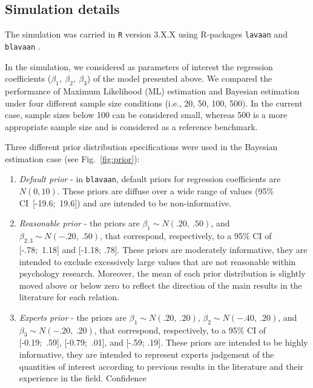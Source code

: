 \documentclass[graybox]{svmult}
\begin{document}
\subsection{Simulation details}

The simulation was carried in \texttt{R} version 3.X.X \cite{rcoreteamLanguageEnvironmentStatistical2018} using R-packages \texttt{lavaan} \cite{rosseelLavaanPackageStructural2012} and \texttt{blavaan} \cite{merkleBlavaanBayesianStructural2018}.

In the simulation, we  considered as parameters of interest the regression coefficients ($\beta_1,\ \beta_2,\ \beta_3$) of the model presented above. We compared the performance of Maximum Likelihood (ML) estimation and Bayesian estimation under four different sample size conditions (i.e., 20, 50, 100, 500). In the current case, sample sizes below 100 can be considered small, whereas 500 is a more appropriate sample size and is considered as a reference benchmark.

Three different prior distribution specifications were used in the Bayesian estimation case (see Fig.~\ref{fig:prior}):

\begin{enumerate}
	\item{\textit{Default prior} -  in \texttt{blavaan}, default priors for regression coefficients are $N(0,10)$}. These priors are diffuse over a wide range of values (95\% CI\ [-19.6;\ 19.6]) and are intended to be non-informative.
	\item{\textit{Reasonable prior} - the priors are $\beta_1\sim N(.20,\ .50)$, and  $\beta_{2;3}\sim N(-.20,\ .50)$, that correspond, respectively, to a 95\% CI of  [-.78;\ 1.18] and  [-1.18; .78]. These priors are moderately informative, they are intended to exclude excessively large values that are not reasonable within psychology research. Moreover, the mean of each prior distribution is slightly moved above or below zero to reflect the direction of the main results in the literature for each relation.}
 	\item{\textit{Experts prior} - the priors are $\beta_1\sim N(.20,\ .20)$,  $\beta_{2}\sim N(-.40,\ .20)$}, and $\beta_3\sim N(-.20,\ .20)$, that correspond, respectively, to a 95\% CI of  [-0.19;\ .59], [-0.79;\ .01], and  [-.59; .19]. These priors are intended to be highly informative, they are intended to represent experts judgement of the quantities of interest according to previous results in the literature and their experience in the field. Confidence 
\end{enumerate}
\end{document}
